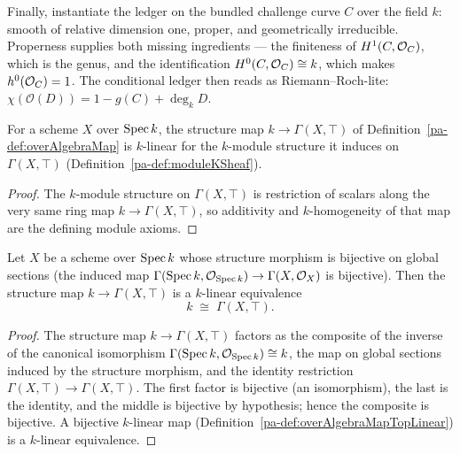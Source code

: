 Finally, instantiate the ledger on the bundled challenge curve \(C\) over the field \(k\): smooth
of relative dimension one, proper, and geometrically irreducible. Properness supplies both
missing ingredients --- the finiteness of \(H^1(C, \mathcal{O}_{C})\), which is the genus, and the
identification \(H^0(C, \mathcal{O}_{C}) \cong k\), which makes \(h^0(\mathcal{O}_{C}) = 1\). The conditional
ledger then reads as Riemann--Roch-lite: \(\chi(\mathcal O(D)) = 1 - g(C) + \deg_k D\).

\begin{definition}
  \label{pa-def:overAlgebraMapTopLinear}
  \leanok

  For a scheme \(X\) over \(\operatorname{Spec} k\), the structure map \(k \to \Gamma(X, \top)\) of
  Definition~\ref{pa-def:overAlgebraMap} is \(k\)-linear for the \(k\)-module structure it induces
  on \(\Gamma(X, \top)\) (Definition~\ref{pa-def:moduleKSheaf}).
\end{definition}
\begin{proof}
  \leanok
  The \(k\)-module structure on \(\Gamma(X, \top)\) is restriction of scalars along the very same
  ring map \(k \to \Gamma(X, \top)\), so additivity and \(k\)-homogeneity of that map are the
  defining module axioms.
\end{proof}

\begin{theorem}
  \label{pa-thm:overAlgebraMapTopEquiv}
  \leanok

  Let \(X\) be a scheme over \(\operatorname{Spec} k\) whose structure morphism is bijective on global sections
  (the induced map \(\Gamma(\operatorname{Spec} k, \mathcal{O}_{\operatorname{Spec} k}) \to \Gamma(X, \mathcal{O}_{X})\) is bijective).
  Then the structure map \(k \to \Gamma(X, \top)\) is a \(k\)-linear equivalence
  \[
    k \;\cong\; \Gamma(X, \top).
  \]
\end{theorem}
\begin{proof}
  \leanok
  The structure map \(k \to \Gamma(X, \top)\) factors as the composite of the inverse of the
  canonical isomorphism \(\Gamma(\operatorname{Spec} k, \mathcal{O}_{\operatorname{Spec} k}) \cong k\), the map on global sections
  induced by the structure morphism, and the identity restriction \(\Gamma(X, \top) \to
  \Gamma(X, \top)\). The first factor is bijective (an isomorphism), the last is the identity,
  and the middle is bijective by hypothesis; hence the composite is bijective. A bijective
  \(k\)-linear map (Definition~\ref{pa-def:overAlgebraMapTopLinear}) is a \(k\)-linear equivalence.
\end{proof}

